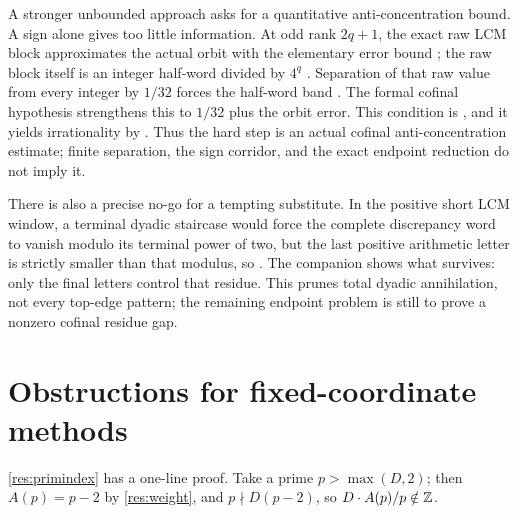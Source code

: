 \documentclass[11pt]{article}
\newcommand{\Aw}{A}
\begin{document}
A stronger unbounded approach asks for a quantitative anti-concentration
bound.  A sign alone gives too little information.  At odd rank \(2q+1\), the exact raw
LCM block approximates the actual orbit with the elementary error bound
;
the raw block itself is an integer half-word divided by \(4^q\)
.
Separation of that raw value from every integer by \(1/32\) forces the
half-word band
.
The formal cofinal hypothesis strengthens this to \(1/32\) plus the orbit
error. This condition is
,
and it yields irrationality by
.
Thus the hard step is an actual cofinal anti-concentration estimate; finite
separation, the sign corridor, and the exact endpoint reduction do not imply
it.

There is also a precise no-go for a tempting substitute.  In the positive
short LCM window, a terminal dyadic staircase would force the complete
discrepancy word to vanish modulo its terminal power of two, but the last
positive arithmetic letter is strictly smaller than that modulus, so
.
The companion
shows what survives: only the final letters control that residue.  This
prunes total dyadic annihilation, not every top-edge pattern; the remaining
endpoint problem is still to prove a nonzero cofinal residue gap.

\section{Obstructions for fixed-coordinate methods}\label{sec:nogo}

\ref{res:primindex} has a one-line proof.  Take a prime
$p>\max(D,2)$; then $\Aw(p)=p-2$ by \ref{res:weight}, and $p\nmid D(p-2)$, so
$D\cdot\Aw(p)/p\notin\Z$.
\end{document}
